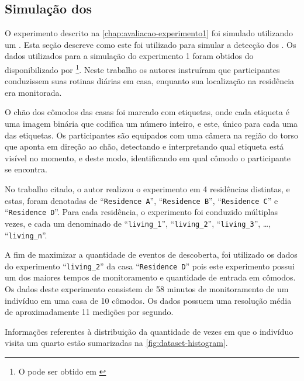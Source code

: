 \subsection{Simulação dos \beacons}\label{chap:avaliacao-simulacao-beacons}

O experimento descrito na \autoref{chap:avaliacao-experimento1} foi simulado utilizando um \dataset. Esta seção descreve como este \dataset foi utilizado para simular a detecção dos \beacons. Os dados utilizados para a simulação do experimento 1 foram obtidos do \dataset disponibilizado por \footnote{O \dataset pode ser obtido em \cite{byrne:kozlowski:dataset:2019}}. Neste trabalho os autores instruíram que participantes conduzissem suas rotinas diárias em casa, enquanto sua localização na residência era monitorada.

O chão dos cômodos das casas foi marcado com etiquetas, onde cada etiqueta é uma imagem binária que codifica um número inteiro, e este, único para cada uma das etiquetas. Os participantes são equipados com uma câmera na região do torso que aponta em direção ao chão, detectando e interpretando qual etiqueta está visível no momento, e deste modo, identificando em qual cômodo o participante se encontra.

No trabalho citado, o autor realizou o experimento em 4 residências distintas, e estas, foram denotadas de ``\texttt{Residence A}'', ``\texttt{Residence B}'', ``\texttt{Residence C}'' e ``\texttt{Residence D}''. Para cada residência, o experimento foi conduzido múltiplas vezes, e cada um denominado de ``\texttt{living\_1}'', ``\texttt{living\_2}'', ``\texttt{living\_3}'', \dots{}, ``\texttt{living\_n}''.


A fim de maximizar a quantidade de eventos de descoberta, foi utilizado os dados do experimento ``\texttt{living\_2}'' da casa ``\texttt{Residence D}'' pois este experimento possui um dos maiores tempos de monitoramento e quantidade de entrada em cômodos. Os dados deste experimento consistem de 58 minutos de monitoramento de um indivíduo em uma casa de 10 cômodos. Os dados possuem uma resolução média de aproximadamente 11 medições por segundo.

Informações referentes à distribuição da quantidade de vezes em que o indivíduo visita um quarto estão sumarizadas na \autoref{fig:dataset-histogram}.

